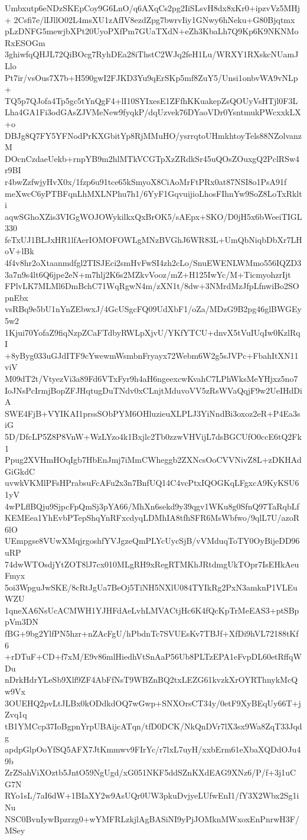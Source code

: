 Umbxutp6eNDzSKEpCoy9G6LnO/q6AXqCs2pg2IiSLsvH8dx8xKr0+ipzvVz5MHj+
2Csfi7e/lIJllO02L4msXU1zAfIV8ezdZpg7bwrvIiy1GNwy6hNeku+G80Bjqtmx
pLzDNFG5mewjbXPt20UyoPXfPm7GUaTXdN+eZh3KbaLh7Q9Kp6K9NKNMoRxESOGm
3ghiwfqQHJL72QiBOcg7RyhDEa28iThstC2WJq2feH1Lu/WRXY1RXskcNUamJLlo
Pt7ir/vsOus7X7b+H590gwI2FJKD3Yu9qErSKp5mf8ZuY5/Unsi1onbvWA9vNLp+
TQ5p7QJofa4Tp5gc5tYnQgF4+lI10SYIxesE1ZFfhKKuakepZsQOUyVsHTjl0F3L
Lha4GA1Fi3odGAsZJVMeNew9fyqkP/dqUzvek76DYaoVDr0YsntmukPWcxxkLX+o
DBJg8Q7FY5YFNodPrKXGbitYp8RjMMuHO/ysrrqtoUHmkhtoyTels88NZolvanzM
DOcnCzdaeUekb+rnpYB9m2hlMTkVCGTpXzZRdkSr45uQOsZOuxgQ2PclRSw4r9BI
r4bwZzfwjyHvX0x/1fzp6u91tce65kSmyoX8CiAoMrFtPRx0at87NSI8o1PsA91f
meXwcC6yPTBFqnLhMXLNPhu7h1/6YyF1GqvuijioLhosFIhnYw9SoZ8LoTxRklti
aqwSGhoXZis3VIGgWOJOWykilkxQxBrOK5/sAEpx+SKO/D0jH5x6bWeeiTIGL330
feTxUJ1BLJxHR1lfAerIOMOFOWLgMNzBVGhJ6WR83L+UmQbNiqbDbXr7LHoV+lBk
4f4v8hr2oXtaanmdfgl2TISJEci2smHvFwSI4zh2cLo/SnuEWENLWMmo556IQZD3
3a7n9s4lt6Q6jpe2eN+m7hlj2K6s2MZkvVooz/mZ+H125IwYc/M+TicmyohzrIjt
FPlvLK7MLMl6DmBchC71WqRgwN4m/zXN1t/8dw+3NMrdMzJfpLfnwiBo2SOpnEbx
vsRBq9e5bU1nYnZEbwxJ/4GcUSgcFQ09UdXbF1/oZa/MDzG9B2pg46glBWGEy5w2
1Kjui70YofaZ9fiqNzpZCaFTdbyRWLpXjvU/YKfYTCU+dnvX5tVuIUqIw0KzlRqI
+8yByg033uGJdITF9cYwewmWsmbnFryayx72Webm6W2g5sJVPc+FbahItXN11viV
M09dT2t/VtyezVi3a89Fd6VTxFyr9h4aH6ngeexcwKvahC7LPhWksMeYHjxz5no7
IoJNsPcIrmjBopZFJHqtugDuTNdv0xCLnjtMduvoVV5zRsWVaQqjF9w2UeIHdDiA
SWE4FjB+VYIKAI1prssSObPYM6OHluzieuXLPLJ3YiNndBi3oxoz2eR+P4Ea3siG
5D/DfcLP5Z8P8VnW+WzLYzo4k1Bxjlc2Tb0zzwVHVijL7dsBGCUfO0ccE6tQ2Fk1
Ppug2XVHmHOqIgb7HbEnJmj7iMmCWheggb2ZXNcsOoCVVNivZ8L+zDKHAdGiGkdC
uvwkVKMlPFsHPrabsuFcAFu2x3n7BnfUQ14C4vcPtxIQOGKqLFgxcA9KyKSU61yV
4wPLflBQju9SjpcFpQmSj3pYA66/MhXn6sekd9y39qgv1WKu8g0SfnQ97TaRqbLf
KEMEea1YhEvbPTepShqYnRFxcdyqLDMhIA8tfhSFR6MsWbfwo/9qlL7U/azoR6lO
UEmpgse8VUwXMqjrgoshfYVJgzeQmPLYcUycSjB/vVMduqToTY0OyBijeDD96uRP
74dwWTOsdjYtZOT8lJ7cx010MLgRH9xRegRTMKhJRtdmgUkTOpr7IsEHkAeuFmyx
5oi3WpguJwSKE/8cRtJgUa7BeOj5TiNH5NXlU084TYIkRg2PxN3amknP1VLEuWZU
1qneXA6NsUcACMWH1YJHFdAeLvhLMVACtjHc6K4fQcKpTrMeEAS3+ptSBppVm3DN
fBG+9bg2YlfPN5hzr+nZAcFgU/hPbdnTc7SVUEsKv7TBJf+XfDi9hVL72188tKf6
+rDTuF+CD+f7xM/E9v86mlHiedhVtSnAaP56Ub8PLTzEPA1eFvpDL60etRffqWDu
nDrkHdrYLeSb9Xlf9ZF4AbFfNsT9WBZnBQ2txLEZG61kvzkXrOYRThnykMcQw9Vx
3OUEHQ2pvLtJLBx0kODdkdOQ7wGwp+SNXOrsCT34y/0etF9XyBEqUy66T+jZvq1q
tB1YMCcp37IoBgpnYrpUBAijcATqn/tfD0DCK/NkQnDVr7lX3sx9Wa8ZqT33Jqdg
apdpGlpOoYfSQ5AFX7JtKmmwv9FIrYc/r7lxL7uyH/xxbErm61eXbaXQDdOJu49b
ZrZSahViXOztb5JntO59NgUgd/xG051NKF5ddSZnKXdEAG9XNz6/P/f+3j1uCG7N
RYo1sL/7aI6dW+1BIaXY2w9AsUQr0UW3pkuDvjyeLUfwEnI1/fY3X2Wbx2Sg1iNu
NSC0BvnIywBpzrzg0+wYMFRLzkjlAgBASiNI9yPjJOMknMWxoxEnPnrwH3F/MSey
